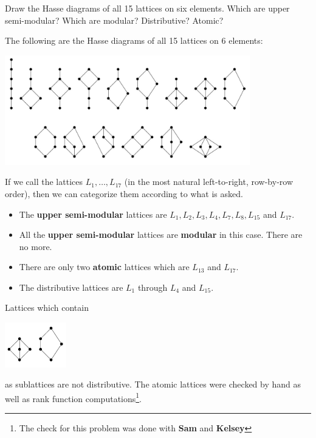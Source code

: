 \documentclass[12pt]{memoir}
\begin{document}
\begin{Ej}[Exercise 4]
    Draw the Hasse diagrams of all 15 lattices on six elements. Which are upper semi-modular? Which are modular? Distributive? Atomic?
\end{Ej}

\begin{ptcbr}
    The following are the Hasse diagrams of all 15 lattices on 6 elements:
    \begin{center}
        \includegraphics[width=0.8\textwidth,trim= 1em 1em 1em 1em]{fig1}        
    \end{center}
    If we call the lattices $L_1,\dots,L_{17}$ (in the most natural left-to-right, row-by-row order), then we can categorize them according to what is asked.
    \begin{itemize}
        \itemsep=-0.4em
        \item The \textbf{upper semi-modular} lattices are $L_1,L_2,L_3,L_4,L_7,L_8,L_{15}$ and $L_{17}$.
        \item All the \textbf{upper semi-modular} lattices are \textbf{modular} in this case. There are no more. 
        \item There are only two \textbf{atomic} lattices which are $L_{13}$ and $L_{17}$. 
        \item The distributive lattices are $L_1$ through $L_4$ and $L_{15}$.
    \end{itemize}
    Lattices which contain 
    \begin{center}
        \includegraphics[width=0.2\textwidth,trim= 1em 1em 1em 1em]{fig2}        
    \end{center}
as sublattices are not distributive. The atomic lattices were checked by hand as well as rank function computations\footnote{The check for this problem was done with \textbf{Sam} and \textbf{Kelsey}}. 
\end{ptcbr}
\end{document}
